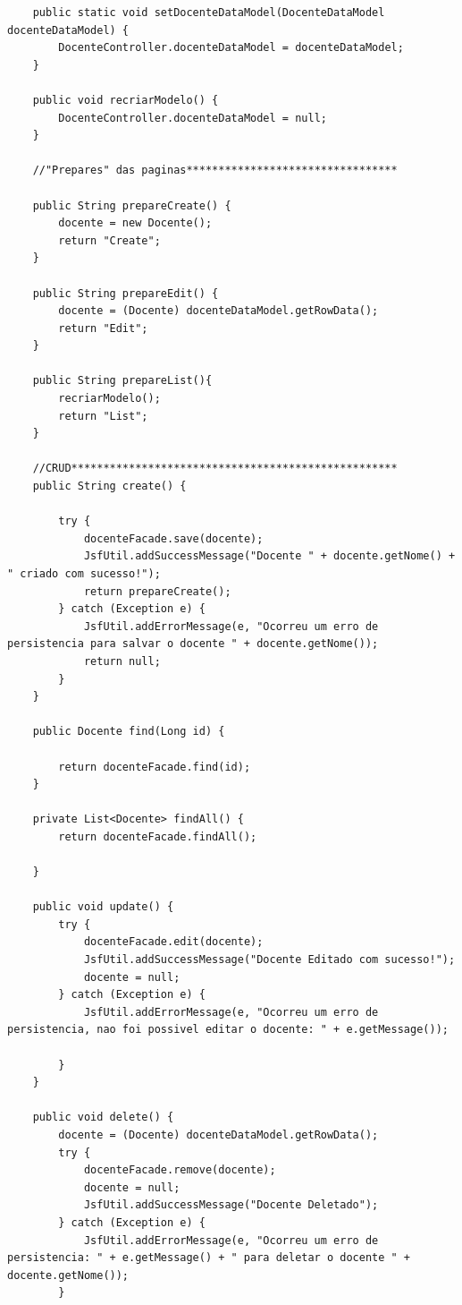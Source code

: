 \documentclass[12pt,a4paper]{article}
\begin{document}
\begin{lstlisting}
    public static void setDocenteDataModel(DocenteDataModel docenteDataModel) {
        DocenteController.docenteDataModel = docenteDataModel;
    }

    public void recriarModelo() {
        DocenteController.docenteDataModel = null;
    }

    //"Prepares" das paginas*********************************
    
    public String prepareCreate() {
        docente = new Docente();
        return "Create";    
    }

    public String prepareEdit() {
        docente = (Docente) docenteDataModel.getRowData();
        return "Edit";
    }
    
    public String prepareList(){
        recriarModelo();
        return "List";
    }

    //CRUD***************************************************
    public String create() {

        try {
            docenteFacade.save(docente);
            JsfUtil.addSuccessMessage("Docente " + docente.getNome() + " criado com sucesso!");
            return prepareCreate();
        } catch (Exception e) {
            JsfUtil.addErrorMessage(e, "Ocorreu um erro de persistencia para salvar o docente " + docente.getNome());
            return null;
        }
    }

    public Docente find(Long id) {

        return docenteFacade.find(id);
    }

    private List<Docente> findAll() {
        return docenteFacade.findAll();

    }

    public void update() {
        try {
            docenteFacade.edit(docente);
            JsfUtil.addSuccessMessage("Docente Editado com sucesso!");
            docente = null;
        } catch (Exception e) {
            JsfUtil.addErrorMessage(e, "Ocorreu um erro de persistencia, nao foi possivel editar o docente: " + e.getMessage());

        }
    }

    public void delete() {
        docente = (Docente) docenteDataModel.getRowData();
        try {
            docenteFacade.remove(docente);
            docente = null;
            JsfUtil.addSuccessMessage("Docente Deletado");
        } catch (Exception e) {
            JsfUtil.addErrorMessage(e, "Ocorreu um erro de persistencia: " + e.getMessage() + " para deletar o docente " + docente.getNome());
        }


\end{lstlisting}
\end{document}
